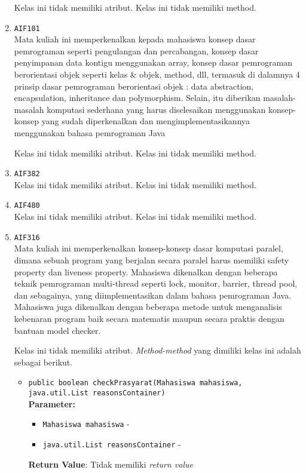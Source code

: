 \documentclass{article}
\begin{document}
\begin{enumerate}
Kelas ini tidak memiliki atribut. Kelas ini tidak memiliki method. \item \texttt{AIF101}\\ 
Mata kuliah ini memperkenalkan kepada mahasiswa konsep dasar pemrograman 
 seperti pengulangan dan percabangan, konsep dasar penyimpanan data kontigu 
 menggunakan array, konsep dasar pemrograman berorientasi objek seperti kelas 
 \& objek, method, dll, termasuk di dalamnya 4 prinsip dasar pemrograman 
 berorientasi objek : data abstraction, encapsulation, inheritance dan 
 polymorphism. Selain, itu diberikan masalah-masalah komputasi sederhana 
 yang harus diselesaikan menggunakan konsep-konsep yang  sudah diperkenalkan 
 dan mengimplementasikannya menggunakan bahasa pemrograman Java

Kelas ini tidak memiliki atribut. Kelas ini tidak memiliki method. \item \texttt{AIF382}\\ 


Kelas ini tidak memiliki atribut. Kelas ini tidak memiliki method. \item \texttt{AIF480}\\ 


Kelas ini tidak memiliki atribut. Kelas ini tidak memiliki method. \item \texttt{AIF316}\\ 
Mata kuliah ini memperkenalkan konsep-konsep dasar komputasi paralel, dimana sebuah 
 program yang berjalan secara paralel harus memiliki safety property dan liveness property. 
 Mahasiswa dikenalkan dengan beberapa teknik pemrograman multi-thread
 seperti lock, monitor, barrier, thread pool, dan sebagainya, yang diimplementasikan 
 dalam bahasa pemrograman Java. Mahasiswa juga dikenalkan dengan beberapa metode untuk 
 menganalisis kebenaran program baik secara matematis maupun secara praktis dengan bantuan 
 model checker.

Kelas ini tidak memiliki atribut. \textit{Method-method} yang dimiliki kelas ini adalah sebagai berikut.
\begin{itemize}
\item \texttt{public boolean checkPrasyarat(Mahasiswa mahasiswa, java.util.List reasonsContainer)}\\ 


\textbf{Parameter:}\begin{itemize}
\item \texttt{Mahasiswa mahasiswa} - 
\item \texttt{java.util.List reasonsContainer} - 
\end{itemize}
\textbf{Return Value}: Tidak memiliki \textit{return value}


\end{itemize}
\end{enumerate}
\end{document}
